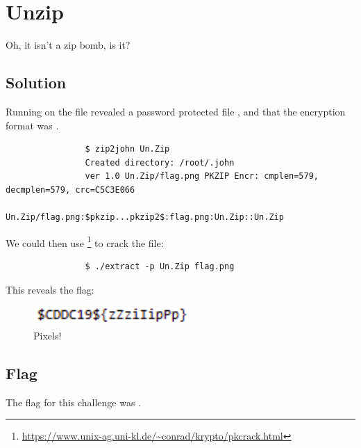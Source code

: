 

\pagebreak
\section{Unzip}

	Oh, it isn't a zip bomb, is it?

	\subsection{Solution}
		Running  on the file revealed a password protected file , and that the encryption
		format was .

		\begin{listing}[!htbp]
			\begin{verbatim}
				$ zip2john Un.Zip
				Created directory: /root/.john
				ver 1.0 Un.Zip/flag.png PKZIP Encr: cmplen=579, decmplen=579, crc=C5C3E066
				Un.Zip/flag.png:$pkzip...pkzip2$:flag.png:Un.Zip::Un.Zip
			\end{verbatim}
		\end{listing}

		We could then use \footnote{\url{https://www.unix-ag.uni-kl.de/~conrad/krypto/pkcrack.html}} to
		crack the file:

		\begin{listing}[!htbp]
			\begin{verbatim}
				$ ./extract -p Un.Zip flag.png
			\end{verbatim}
		\end{listing}

		This reveals the flag:

		\begin{figure}[!htbp]\centering
			\includegraphics[width=60mm]{figures/unzip.png} \vspace{5mm}
			\caption{Pixels!}
		\end{figure}


	\subsection{Flag}
		The flag for this challenge was .











